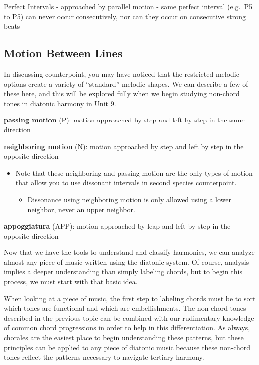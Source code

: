 \documentclass{book}
\providecommand{\tightlist}{%
  \setlength{\itemsep}{0pt}\setlength{\parskip}{0pt}}
\begin{document}
Perfect Intervals - approached by parallel motion - same perfect interval
(e.g.~P5 to P5) can never occur consecutively, nor can they occur on
consecutive strong beats

\hypertarget{motion-between-lines}{%
\subsection{Motion Between Lines}\label{motion-between-lines}}

In discussing counterpoint, you may have noticed that the restricted melodic
options create a variety of ``standard'' melodic shapes. We can describe a few
of these here, and this will be explored fully when we begin studying
non-chord tones in diatonic harmony in Unit 9.

\textbf{passing motion} (P): motion approached by step and left by step in the
same direction

\textbf{neighboring motion} (N): motion approached by step and left by step in
the opposite direction

\begin{itemize}
\tightlist
\item
  Note that these neighboring and passing motion are the only types of motion
  that allow you to use dissonant intervals in second species counterpoint.

  \begin{itemize}
  \tightlist
  \item
    Dissonance using neighboring motion is only allowed using a lower
    neighbor, never an upper neighbor.
  \end{itemize}
\end{itemize}

\textbf{appoggiatura} (APP): motion approached by leap and left by step in the
opposite direction

Now that we have the tools to understand and classify harmonies, we can
analyze almost any piece of music written using the diatonic system. Of
course, analysis implies a deeper understanding than simply labeling chords,
but to begin this process, we must start with that basic idea.

When looking at a piece of music, the first step to labeling chords must be to
sort which tones are functional and which are embellishments. The non-chord
tones described in the previous topic can be combined with our rudimentary
knowledge of common chord progressions in order to help in this
differentiation. As always, chorales are the easiest place to begin
understanding these patterns, but these principles can be applied to any piece
of diatonic music because these non-chord tones reflect the patterns necessary
to navigate tertiary harmony.
\end{document}
